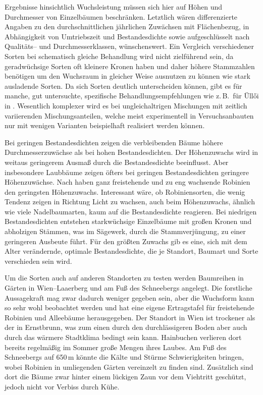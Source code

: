 \documentclass[twocolumn]{scrartcl}
\begin{document}
Ergebnisse hinsichtlich Wuchsleistung müssen sich hier auf Höhen und
Durchmesser von Einzelbäumen beschränken.  Letztlich wären
differenzierte Angaben zu den durchschnittlichen jährlichen Zuwächsen
mit Flächenbezug, in Abhängigkeit von Umtriebszeit und Bestandesdichte
sowie aufgeschlüsselt nach Qualitäts-- und Durchmesserklassen,
wünschenswert.  Ein Vergleich verschiedener Sorten bei schematisch
gleiche Behandlung wird nicht zielführend sein, da geradwüchsige
Sorten oft kleinere Kronen haben \citep{bujtas1984robinie} und daher
höhere Stammzahlen benötigen \citep{keresztesi1974robinie} um den
Wuchsraum in gleicher Weise ausnutzen zu können wie stark ausladende
Sorten. Da sich Sorten deutlich unterscheiden können, gibt es für
manche, gut untersuchte, spezifische Behandlungsempfehlungen wie
z.\,B.\ für Üllői in \citet{redei2020ulloi}. Wesentlich komplexer wird
es bei ungleichaltrigen Mischungen mit zeitlich variierenden
Mischungsanteilen, welche meist experimentell in Versuchsanbauten nur
mit wenigen Varianten beispielhaft realisiert werden können.

Bei geringen Bestandesdichten zeigen die verbleibenden Bäume höhere
Durchmesserzuwächse als bei hohen Bestandesdichten. Der Höhenzuwachs
wird in weitaus geringerem Ausmaß durch die Bestandesdichte
beeinflusst. Aber insbesondere Laubbäume zeigen öfters bei geringen
Bestandesdichten geringere Höhenzuwächse.
Nach \citet[S.~55]{bluemke1955robinie} haben ganz freistehende und zu eng
wachsende Robinien den geringsten Höhenzuwachs.
Interessant wäre, ob
Robiniensorten, die wenig Tendenz zeigen in Richtung Licht zu wachsen,
auch beim Höhenzuwachs, ähnlich wie viele Nadelbaumarten, kaum auf die
Bestandesdichte reagieren. Bei niedrigen Bestandesdichten entstehen
starkwüchsige Einzelbäume mit großen Kronen und abholzigen Stämmen,
was im Sägewerk, durch die Stammverjüngung, zu einer geringeren
Ausbeute führt. Für den größten Zuwachs gib es eine, sich mit dem
Alter verändernde, optimale Bestandesdichte, die je Standort, Baumart
und Sorte verschieden sein wird.

Um die Sorten auch auf anderen Standorten zu testen werden Baumreihen in Gärten
in Wien--Laaerberg und am Fuß des Schneebergs angelegt. Die forstliche
Aussagekraft mag zwar dadurch weniger gegeben sein, aber die Wuchsform
kann so sehr wohl beobachtet werden und \citet{fekete1931robinieErtragstafel}
hat eine eigene Ertragstafel für freistehende Robinien und Alleebäume
herausgegeben.
Der Standort in Wien ist
trockener als der in Ernstbrunn, was zum einen durch den durchlässigeren Boden
aber auch durch das wärmere Stadtklima bedingt sein kann. Hainbuchen verlieren
dort bereits regelmäßig im Sommer große Mengen ihres Laubes. Am Fuß des
Schneebergs auf 650\,m könnte die Kälte und Stürme Schwierigkeiten bringen,
wobei Robinien in umliegenden Gärten vereinzelt zu finden sind. Zusätzlich sind
dort die Bäume zwar hinter einem lückigen Zaun vor dem Viehtritt geschützt,
jedoch nicht vor Verbiss durch Kühe.
\end{document}
